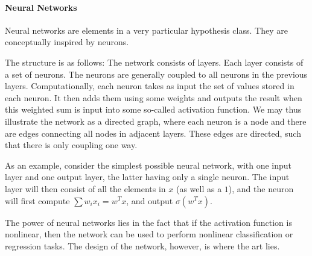 \paragraph{Neural Networks}
Neural networks are elements in a very particular hypothesis class. They are conceptually inspired by neurons.

The structure is as follows: The network consists of layers. Each layer consists of a set of neurons. The neurons are generally coupled to all neurons in the previous layers. Computationally, each neuron takes as input the set of values stored in each neuron. It then adds them using some weights and outputs the result when this weighted sum is input into some so-called activation function. We may thus illustrate the network as a directed graph, where each neuron is a node and there are edges connecting all nodes in adjacent layers. These edges are directed, such that there is only coupling one way.

As an example, consider the simplest possible neural network, with one input layer and one output layer, the latter having only a single neuron. The input layer will then consist of all the elements in $x$ (as well as a $1$), and the neuron will first compute $\sum w_{i}x_{i} = w^{T}x$, and output $\sigma(w^{T}x)$.

The power of neural networks lies in the fact that if the activation function is nonlinear, then the network can be used to perform nonlinear classification or regression tasks. The design of the network, however, is where the art lies.


